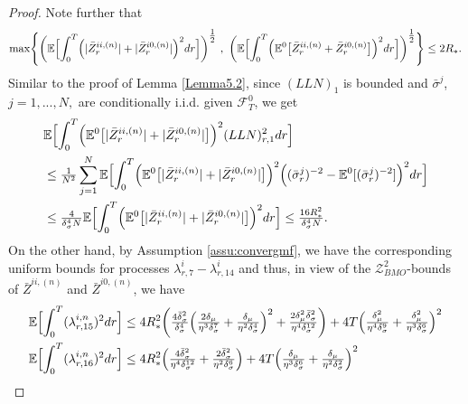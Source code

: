 \documentclass[10pt,a4paper]{amsart}
\begin{document}
\begin{proof}
Note further that
\begin{align}
\max\Biggl\{\biggl(\mathbb{E}\Bigl[\int_{0}^{T}\Bigl(|\bar{Z}_{r}^{ii,(n)}| + |\bar{Z}_{r}^{i0,(n)}|\Bigr)^{2}dr\Bigr]\biggr)^{\tfrac{1}{2}} \ , \ \biggl(\mathbb{E}\Bigl[\int_{0}^{T}\Bigl(\mathbb{E}^{0}\bigl[\bar{Z}_{r}^{ii,(n)}+\bar{Z}_{r}^{i0,(n)}\bigr]\Bigr)^{2}dr\Bigr]\biggr)^{\tfrac{1}{2}}\Biggr\} \leq 2R_{*}. \label{equ:5.est1}
\end{align}
Similar to the proof of Lemma \ref{Lemma5.2}, since $(LLN)_{1}$ is bounded and $\bar{\sigma}^{j}$, $j=1,...,N,$ are conditionally i.i.d. given $\mathcal{F}_{T}^{0}$, we get
\begin{align}
&\mathbb{E}\Bigl[\int_{0}^{T}\Bigl(\mathbb{E}^{0}\bigl[|\bar{Z}_{r}^{ii,(n)}|+|\bar{Z}_{r}^{i0,(n)}|\bigr]\Bigr)^{2}(LLN)_{r,1}^{2}dr\Bigr] \nonumber \\
&\leq \tfrac{1}{N^{2}}\sum_{j=1}^{N}\mathbb{E}\Bigl[\int_{0}^{T}\Bigl(\mathbb{E}^{0}\bigl[|\bar{Z}_{r}^{ii,(n)}|+|\bar{Z}_{r}^{i0,(n)}|\bigr]\Bigr)^{2}\Bigl((\bar{\sigma}_{r}^{j})^{-2}-\mathbb{E}^{0}[(\bar{\sigma}_{r}^{j})^{-2}]\Bigr)^{2}dr\Bigr] \nonumber \\
&\leq \tfrac{4}{\delta_{\sigma}^{4}N}\mathbb{E}\Bigl[\int_{0}^{T}\Bigl(\mathbb{E}^{0}\bigl[|\bar{Z}_{r}^{ii,(n)}|+|\bar{Z}_{r}^{i0,(n)}|\bigr]\Bigr)^{2}dr\Bigr] 
\leq \tfrac{16R_{*}^{2}}{\delta_{\sigma}^{4}N}. \label{equ:5.est2}
\end{align}
On the other hand, by Assumption \ref{assu:convergmf}, we have the corresponding uniform bounds for processes $\lambda_{r,7}^{i}-\lambda_{r,14}^{i}$ and thus, in view of the $\mathcal{Z}_{BMO}^{2}$-bounds of $\bar{Z}^{ii,(n)}$ and $\bar{Z}^{i0,(n)}$, we have
\begin{align}
\mathbb{E}\Bigl[\int_{0}^{T}(\lambda_{r,15}^{i,n})^{2}dr\Bigr] &\leq 4R_{*}^{2}\biggl(\tfrac{4\bar{\delta}_{\sigma}^{2}}{\delta_{\sigma}^{4}}\Bigl(\tfrac{2\delta_{\mu}}{\eta^{3}\delta_{\sigma}^{7}} + \tfrac{\delta_{\mu}}{\eta^{2}\delta_{\sigma}^{4}}\Bigr)^{2} + \tfrac{2\delta_{\mu}^{2}\bar{\delta}_{\sigma}^{2}}{\eta^{4}\delta_{\sigma}^{12}}\biggr) + 4T\Bigl(\tfrac{\delta_{\mu}^{2}}{\eta^{4}\delta_{\sigma}^{9}} + \tfrac{\delta_{\mu}^{2}}{\eta^{3}\delta_{\sigma}^{6}}\Bigr)^{2} \label{equ:estlambda15} \\
\mathbb{E}\Bigl[\int_{0}^{T}(\lambda_{r,16}^{i,n})^{2}dr\Bigr] &\leq 4R_{*}^{2}\Bigl(\tfrac{4\bar{\delta}_{\sigma}^{2}}{\eta^{4}\delta_{\sigma}^{12}} + \tfrac{2\bar{\delta}_{\sigma}^{2}}{\eta^{2}\delta_{\sigma}^{6}}\Bigr) + 4T\Bigl(\tfrac{\delta_{\mu}}{\eta^{3}\delta_{\sigma}^{6}} + \tfrac{\delta_{\mu}}{\eta^{2}\delta_{\sigma}^{2}}\Bigr)^{2} \label{equ:estlambda16} \\

\end{align}
\end{proof}
\end{document}
